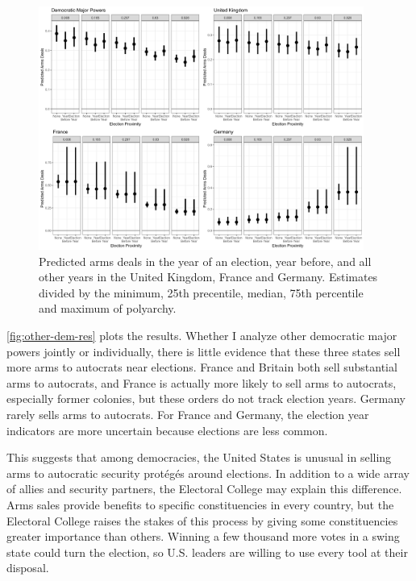 \documentclass[12pt]{article}
\begin{document}
\begin{figure}[htpb]
	\centering
		\includegraphics[width=0.95\textwidth]{other-dem-res.png}
	\caption{Predicted arms deals in the year of an election, year before, and all other years in the United Kingdom, France and Germany. Estimates divided by the minimum, 25th precentile, median, 75th percentile and maximum of polyarchy.}
	\label{fig:other-dem-res}
\end{figure}


\autoref{fig:other-dem-res} plots the results. 
Whether I analyze other democratic major powers jointly or individually, there is little evidence that these three states sell more arms to autocrats near elections. 
France and Britain both sell substantial arms to autocrats, and France is actually more likely to sell arms to autocrats, especially former colonies, but these orders do not track election years. 
Germany rarely sells arms to autocrats.
For France and Germany, the election year indicators are more uncertain because elections are less common. 


This suggests that among democracies, the United States is unusual in selling arms to autocratic security prot{\'e}g{\'e}s around elections. 
In addition to a wide array of allies and security partners, the Electoral College may explain this difference. 
Arms sales provide benefits to specific constituencies in every country, but the Electoral College raises the stakes of this process by giving some constituencies greater importance than others. 
Winning a few thousand more votes in a swing state could turn the election, so U.S. leaders are willing to use every tool at their disposal. 
\end{document}
